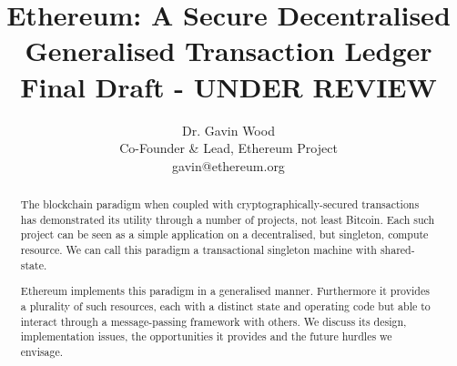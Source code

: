 \documentclass[9pt,oneside]{amsart}
\title{Ethereum: A Secure Decentralised Generalised Transaction Ledger \\ {\smaller \textbf{Final Draft - UNDER REVIEW}}}
\author{
    Dr. Gavin Wood\\
    Co-Founder \& Lead, Ethereum Project\\
    gavin@ethereum.org
}
\begin{document}
\pagecolor{lightyellow}

\begin{abstract}
The blockchain paradigm when coupled with cryptographically-secured transactions has demonstrated its utility through a number of projects, not least Bitcoin. Each such project can be seen as a simple application on a decentralised, but singleton, compute resource. We can call this paradigm a transactional singleton machine with shared-state.

Ethereum implements this paradigm in a generalised manner. Furthermore it provides a plurality of such resources, each with a distinct state and operating code but able to interact through a message-passing framework with others. We discuss its design, implementation issues, the opportunities it provides and the future hurdles we envisage.
\end{abstract}

\maketitle
\end{document}
